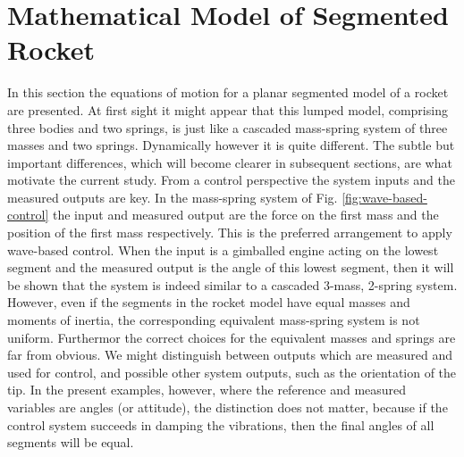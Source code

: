 \documentclass{mbd_fullpaper}
\begin{document}
\section{Mathematical Model of Segmented Rocket}
\label{sec:math-model}
In this section the equations of motion for a planar segmented model of a rocket are presented.
At first sight it might appear that this lumped model, comprising three bodies and two springs, is just like a cascaded mass-spring system of three masses and two springs. Dynamically however it is quite different.
The subtle but important differences, which will become clearer in subsequent sections, are what motivate the current study.
From a control perspective the system inputs and the measured outputs are key.
In the mass-spring system of Fig. \ref{fig:wave-based-control} the input and measured output are the force on the first mass and the position of the first mass respectively.
This is the preferred arrangement to apply wave-based control.
When the input is a gimballed engine acting on the lowest segment and the measured output is the angle of this lowest segment, then it will be shown that the system is indeed similar to a cascaded 3-mass, 2-spring system. However, even if the segments in the rocket model have equal masses and moments of inertia, the corresponding equivalent mass-spring system  is not uniform.
Furthermor the correct choices for the equivalent masses and springs are far from obvious.
We might distinguish between outputs which are measured and used for control, and possible other system outputs, such as the orientation of the tip.
In the present examples, however, where the reference and measured variables are angles (or attitude), the distinction does not matter, because if the control system succeeds in damping the vibrations, then the final angles of all segments will be equal.
\end{document}
